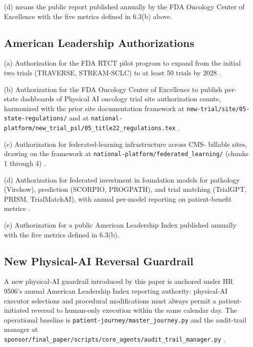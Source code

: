 (d)  means the public report
published annually by the FDA Oncology Center of Excellence with
the five metrics defined in 6.3(b) above.

\subsection{American Leadership Authorizations}

(a) Authorization for the FDA RTCT pilot program to expand from the
initial two trials (TRAVERSE, STREAM-SCLC) to at least 50 trials by
2028 \cite{fda_rtct_press_2026}.

(b) Authorization for the FDA Oncology Center of Excellence to
publish per-state dashboards of Physical AI oncology trial site
authorization counts, harmonized with the prior site documentation
framework at
\texttt{new-trial/site/05-state-regulations/} and at
\texttt{national-platform/new\_trial\_psl/05\_title22\_regulations.tex}
\cite{kawchak_2026_19176370, kawchak_2026_19244918}.

(c) Authorization for federated-learning infrastructure across CMS-
billable sites, drawing on the framework at
\texttt{national-platform/federated\_learning/} (chunks 1 through 4)
\cite{kawchak_2026_19244918}.

(d) Authorization for federated investment in foundation models for
pathology (Virchow), prediction (SCORPIO, PROGPATH), and trial
matching (TrialGPT, PRISM, TrialMatchAI), with annual per-model
reporting on patient-benefit metrics \cite{vorontsov2024virchow,
jin2024trialgpt, gupta2024prism, abdallah2026trialmatchai}.

(e) Authorization for a public American Leadership Index published
annually with the five metrics defined in 6.3(b).

\subsection{New Physical-AI Reversal Guardrail}

A new physical-AI guardrail introduced by this paper is anchored
under HR 9506's annual American Leadership Index reporting
authority: physical-AI executor selections and procedural
modifications must always permit a patient-initiated reversal to
human-only execution within the same calendar day. The operational
baseline is \texttt{patient-journey/master\_journey.py} and the
audit-trail manager at
\texttt{sponsor/final\_paper/scripts/core\_agents/audit\_trail\_manager.py}
\cite{kawchak_2026_19119939, kawchak_2026_19396256}.

